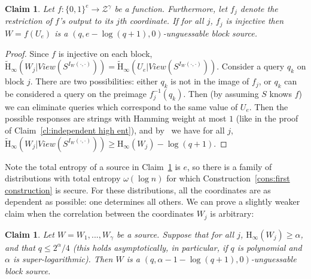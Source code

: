 \documentclass[11pt]{article}
\newcommand{\clref}[1]{\mbox{Claim~\ref{#1}}}
\newcommand{\consref}[1]{\mbox{Construction~\ref{#1}}}
\newcommand{\zo}{\ensuremath{\{0, 1\}}}
\newcommand{\Hoo}{\mathrm{H}_\infty}
\newcommand{\Hav}{\tilde{\mathrm{H}}_\infty}
\newtheorem{claim}[theorem]{Claim}
\begin{document}
\begin{claim}
\label{cl:each block from single seed}
Let $f:\zo^e \rightarrow \mathcal{Z}^\gamma$ be a function.  Furthermore, let $f_j$ denote the restriction of $f$'s output to its $j$th coordinate.  If for all $j$, $f_j$ is injective then $W = f(U_e)$ is a $( q, e - \log (q+1), 0)$-unguessable block source.
\end{claim}
\begin{proof}
Since $f$ is injective on each block, $\Hav(W_j | View(S^{I_{W}(\cdot, \cdot)})) = \Hav(U_e | View(S^{I_{W}(\cdot, \cdot)}))$.  Consider a query $q_k$ on block $j$.  There are two possibilities: either $q_k$ is not in the image of $f_j$,  or $q_k$ can be considered a query on the preimage $f_j^{-1}(q_k)$. Then (by assuming $S$ knows $f$) we can eliminate queries which correspond to the same value of $U_e$.  Then the possible responses are strings with Hamming weight at most $1$ (like in the
proof of \clref{cl:independent high ent}),
 and by~\cite[Lemma 2.2]{DBLP:journals/siamcomp/DodisORS08} we have for all $j$, $\Hav(W_j | View(S^{I_{W}(\cdot, \cdot)})) \geq \Hoo(W_j) -\log (q+1)$.
\end{proof}

Note the total entropy of a source in \clref{cl:each block from single seed} is $e$, so there is a family of distributions with total entropy $\omega(\log n)$ for which \consref{cons:first construction} is secure.  For these distributions, all the coordinates are as dependent as possible: one determines all others.
We can prove a slightly weaker claim when the correlation between the coordinates $W_j$ is arbitrary:

\begin{claim}
\label{cl:all blocks entropy}
Let $W = W_1,..., W_\gamma$ be a source.  Suppose that for all $j$, $\Hoo(W_j)\geq \alpha$, and that $q \le 2^{\alpha}/4$ (this holds asymptotically, in particular, if $q$ is polynomial and $\alpha$ is super-logarithmic). Then  $W$ is a $(q, \alpha-1-\log(q+1), 0)$-unguessable block source.
\end{claim}
\end{document}
